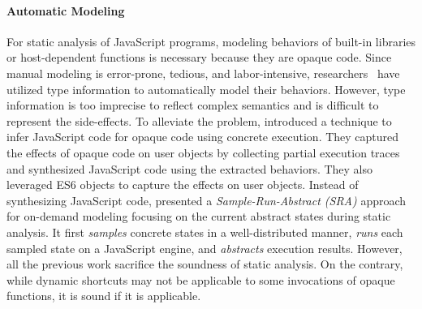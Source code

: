 \paragraph{Automatic Modeling}
For static analysis of JavaScript programs, modeling behaviors of built-in
libraries or host-dependent functions is necessary because they are opaque code.
Since manual modeling is error-prone, tedious, and labor-intensive,
researchers~\cite{safewapi, safets} have utilized type information to
automatically model their behaviors.  However, type information is too imprecise
to reflect complex semantics and is difficult to represent the side-effects.
To alleviate the problem, \citet{mimic} introduced a technique
to infer JavaScript code for opaque code using concrete execution.
They captured the effects of opaque code on user objects by collecting partial
execution traces and synthesized JavaScript code using the extracted behaviors.
They also leveraged ES6  objects to capture the effects on user objects.
Instead of synthesizing JavaScript code,
\citet{opaque-model} presented a \textit{Sample-Run-Abstract (SRA)} approach for
on-demand modeling focusing on the current abstract states during static analysis.
It first \textit{samples} concrete states in a well-distributed manner,
\textit{runs} each sampled state on a JavaScript engine, and \textit{abstracts} execution results.
However, all the previous work sacrifice the soundness of static analysis.
On the contrary, while dynamic shortcuts may not be applicable to some
invocations of opaque functions, it is sound if it is applicable.


